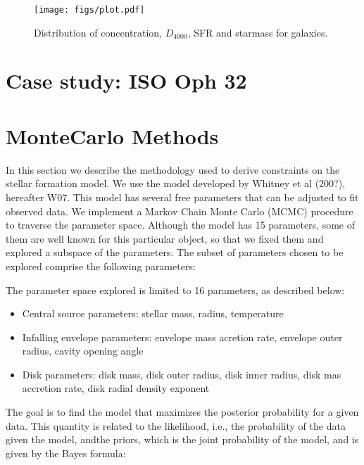 \documentclass{aa}
\begin{document}

\begin{figure}
   \centering
   \texttt{[image: figs/plot.pdf]}
   \caption{
   Distribution of concentration, $D_{4000}$, SFR and starmass for galaxies.
   }
   \label{F_D4000}
\end{figure}





\section{Case study: ISO Oph 32} \label{S_stats}
 

\section{MonteCarlo Methods} \label{S_MCMC}
 
In this section we describe the methodology used to derive constraints
on the stellar formation model.
%
We use the model developed by Whitney et al (200?), hereafter W07.
%
This model has several free parameters that can be adjusted to fit
observed data.
%
We implement a Markov Chain Monte Carlo (MCMC) procedure to traverse
the parameter space. 
%
Although the model has 15 parameters, some of them are well known for
this particular object, so that we fixed them and explored a subspace
of the parameters.
%
The subset of parameters chosen to be explored comprise the following
parameters: 



The parameter space explored is limited to 16 parameters, as described
below:
 
\begin{itemize}
   \item Central source parameters: stellar mass, radius, temperature
   \item Infalling envelope parameters: envelope mass acretion rate,
      envelope outer radius, cavity opening angle
   \item Disk parameters: disk mass, disk outer radius, disk inner
      radius, disk mas accretion rate, disk radial density exponent
\end{itemize}
 




The goal is to find the model that maximizes the posterior probability
for a given data.
%
This quantity is related to the likelihood, i.e., the probability of
the data given the model, andthe priors, which is the joint
probability of the model, and is given by the Bayes formula:
\end{document}
